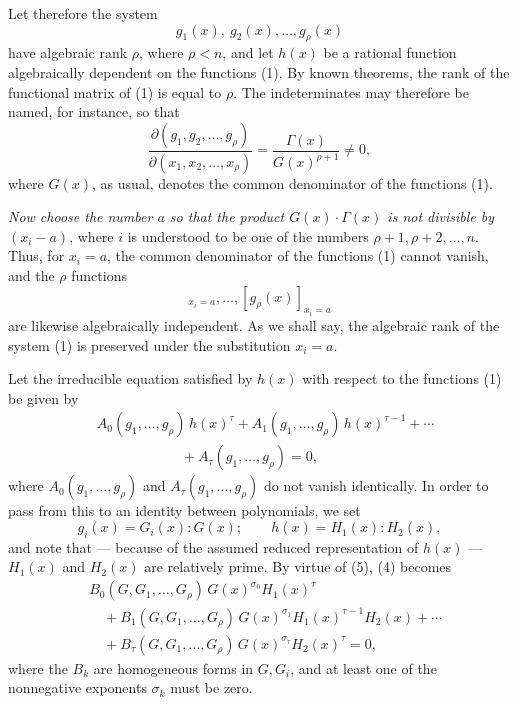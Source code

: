 \documentclass[11pt]{article}
\begin{document}
Let therefore the system
\begin{equation}
  g_1(x),\ g_2(x),\ldots,g_\rho(x)
\tag{1}
\end{equation}
have algebraic rank $\rho$, where $\rho<n$, and let $h(x)$ be a rational function algebraically dependent on the functions (1). By known theorems, the rank of the functional matrix of (1) is equal to $\rho$. The indeterminates may therefore be named, for instance, so that
\begin{equation}
 \frac{\partial(g_1,g_2,\ldots,g_\rho)}{\partial(x_1,x_2,\ldots,x_\rho)}
 =\frac{\Gamma(x)}{G(x)^{\rho+1}}\ne0,
\tag{2}
\end{equation}
where $G(x)$, as usual, denotes the common denominator of the functions (1).

\emph{Now choose the number $a$ so that the product $G(x)\cdot\Gamma(x)$ is not divisible by $(x_i-a)$}, where $i$ is understood to be one of the numbers $\rho+1,\rho+2,\ldots,n$. Thus, for $x_i=a$, the common denominator of the functions (1) cannot vanish, and the $\rho$ functions
\begin{equation}
  [g_1(x)]_{x_i=a},\ldots,[g_\rho(x)]_{x_i=a}
\tag{3}
\end{equation}
are likewise algebraically independent. As we shall say, the algebraic rank of the system (1) is preserved under the substitution $x_i=a$.

Let the irreducible equation satisfied by $h(x)$ with respect to the functions (1) be given by
\begin{equation}
\begin{aligned}
&A_0(g_1,\ldots,g_\rho)\,h(x)^\tau
 +A_1(g_1,\ldots,g_\rho)\,h(x)^{\tau-1}
 +\cdots \\
&\hspace{6em}+A_\tau(g_1,\ldots,g_\rho)=0,
\end{aligned}
\tag{4}
\end{equation}
where $A_0(g_1,\ldots,g_\rho)$ and $A_\tau(g_1,\ldots,g_\rho)$ do not vanish identically. In order to pass from this to an identity between polynomials, we set
\begin{equation}
  g_i(x)=G_i(x):G(x);\qquad h(x)=H_1(x):H_2(x),
\tag{5}
\end{equation}
and note that --- because of the assumed reduced representation of $h(x)$ --- $H_1(x)$ and $H_2(x)$ are relatively prime. By virtue of (5), (4) becomes
\begin{equation}
\begin{aligned}
&B_0(G,G_1,\ldots,G_\rho)\,G(x)^{\sigma_0}H_1(x)^\tau \\
&\quad+B_1(G,G_1,\ldots,G_\rho)\,G(x)^{\sigma_1}H_1(x)^{\tau-1}H_2(x)+\cdots \\
&\quad+B_\tau(G,G_1,\ldots,G_\rho)\,G(x)^{\sigma_\tau}H_2(x)^\tau=0,
\end{aligned}
\tag{6}
\end{equation}
where the $B_k$ are homogeneous forms in $G,G_i$, and at least one of the nonnegative exponents $\sigma_k$ must be zero.
\end{document}

